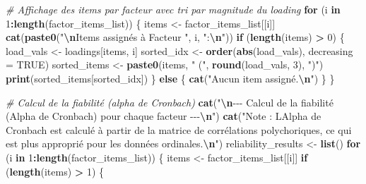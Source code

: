 \documentclass[
]{article}
\newenvironment{Shaded}{\begin{snugshade}}{\end{snugshade}}
\newcommand{\AttributeTok}[1]{\textcolor[rgb]{0.13,0.29,0.53}{#1}}
\newcommand{\CommentTok}[1]{\textcolor[rgb]{0.56,0.35,0.01}{\textit{#1}}}
\newcommand{\ConstantTok}[1]{\textcolor[rgb]{0.56,0.35,0.01}{#1}}
\newcommand{\ControlFlowTok}[1]{\textcolor[rgb]{0.13,0.29,0.53}{\textbf{#1}}}
\newcommand{\DecValTok}[1]{\textcolor[rgb]{0.00,0.00,0.81}{#1}}
\newcommand{\FunctionTok}[1]{\textcolor[rgb]{0.13,0.29,0.53}{\textbf{#1}}}
\newcommand{\NormalTok}[1]{#1}
\newcommand{\OtherTok}[1]{\textcolor[rgb]{0.56,0.35,0.01}{#1}}
\newcommand{\SpecialCharTok}[1]{\textcolor[rgb]{0.81,0.36,0.00}{\textbf{#1}}}
\newcommand{\StringTok}[1]{\textcolor[rgb]{0.31,0.60,0.02}{#1}}
\begin{document}
\begin{Shaded}
\begin{Highlighting}[]
  \CommentTok{\# Affichage des items par facteur avec tri par magnitude du loading}
  \ControlFlowTok{for}\NormalTok{ (i }\ControlFlowTok{in} \DecValTok{1}\SpecialCharTok{:}\FunctionTok{length}\NormalTok{(factor\_items\_list)) \{}
\NormalTok{    items }\OtherTok{\textless{}{-}}\NormalTok{ factor\_items\_list[[i]]}
    \FunctionTok{cat}\NormalTok{(}\FunctionTok{paste0}\NormalTok{(}\StringTok{"}\SpecialCharTok{\textbackslash{}n}\StringTok{Items assignés à Facteur "}\NormalTok{, i, }\StringTok{":}\SpecialCharTok{\textbackslash{}n}\StringTok{"}\NormalTok{))}
    \ControlFlowTok{if}\NormalTok{ (}\FunctionTok{length}\NormalTok{(items) }\SpecialCharTok{\textgreater{}} \DecValTok{0}\NormalTok{) \{}
\NormalTok{      load\_vals }\OtherTok{\textless{}{-}}\NormalTok{ loadings[items, i]}
\NormalTok{      sorted\_idx }\OtherTok{\textless{}{-}} \FunctionTok{order}\NormalTok{(}\FunctionTok{abs}\NormalTok{(load\_vals), }\AttributeTok{decreasing =} \ConstantTok{TRUE}\NormalTok{)}
\NormalTok{      sorted\_items }\OtherTok{\textless{}{-}} \FunctionTok{paste0}\NormalTok{(items, }\StringTok{" ("}\NormalTok{, }\FunctionTok{round}\NormalTok{(load\_vals, }\DecValTok{3}\NormalTok{), }\StringTok{")"}\NormalTok{)}
      \FunctionTok{print}\NormalTok{(sorted\_items[sorted\_idx])}
\NormalTok{    \} }\ControlFlowTok{else}\NormalTok{ \{}
      \FunctionTok{cat}\NormalTok{(}\StringTok{"Aucun item assigné.}\SpecialCharTok{\textbackslash{}n}\StringTok{"}\NormalTok{)}
\NormalTok{    \}}
\NormalTok{  \}}

  \CommentTok{\# Calcul de la fiabilité (alpha de Cronbach)}
  \FunctionTok{cat}\NormalTok{(}\StringTok{"}\SpecialCharTok{\textbackslash{}n}\StringTok{{-}{-}{-} Calcul de la fiabilité (Alpha de Cronbach) pour chaque facteur {-}{-}{-}}\SpecialCharTok{\textbackslash{}n}\StringTok{"}\NormalTok{)}
  \FunctionTok{cat}\NormalTok{(}\StringTok{"Note : L\textquotesingle{}Alpha de Cronbach est calculé à partir de la matrice de corrélations polychoriques, ce qui est plus approprié pour les données ordinales.}\SpecialCharTok{\textbackslash{}n}\StringTok{"}\NormalTok{)}
\NormalTok{  reliability\_results }\OtherTok{\textless{}{-}} \FunctionTok{list}\NormalTok{()}
  \ControlFlowTok{for}\NormalTok{ (i }\ControlFlowTok{in} \DecValTok{1}\SpecialCharTok{:}\FunctionTok{length}\NormalTok{(factor\_items\_list)) \{}
\NormalTok{    items }\OtherTok{\textless{}{-}}\NormalTok{ factor\_items\_list[[i]]}
    \ControlFlowTok{if}\NormalTok{ (}\FunctionTok{length}\NormalTok{(items) }\SpecialCharTok{\textgreater{}} \DecValTok{1}\NormalTok{) \{}
      

\end{Highlighting}
\end{Shaded}
\end{document}

